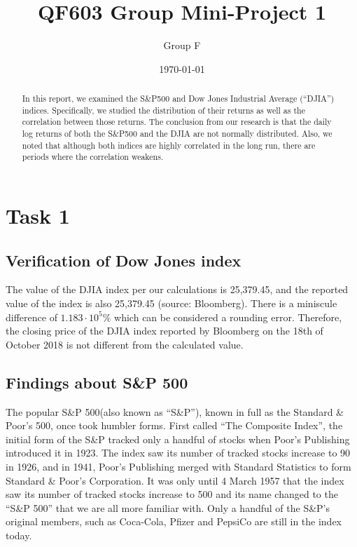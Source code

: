 \documentclass[a4paper]{article}
\title{QF603 Group Mini-Project 1}
\author{Group F}
\date{\today}
\begin{document}
	\maketitle
	
	\begin{abstract}
		In this report, we examined the S\&P500 and Dow Jones Industrial Average (``DJIA'') indices. Specifically, we studied the distribution of their returns as well as the correlation between those returns. The conclusion from our research is that the daily log returns of both the S\&P500 and the DJIA are not normally distributed. Also, we noted that although both indices are highly correlated in the long run, there are periods where the correlation weakens.
	\end{abstract} 
	
	\section{Task 1}
	\label{sec:introduction}
	
	\subsection{Verification of Dow Jones index}
	The value of the DJIA index per our calculations is 25,379.45, and the reported value of the index is also 25,379.45 (source: Bloomberg). There is a miniscule difference of $1.183\cdot10^5\%$ which can be considered a rounding error. Therefore, the closing price of the DJIA index reported by Bloomberg on the 18th of October 2018 is not different from the calculated value.
	
	
	\subsection{Findings about S\&P 500}
	The popular S\&P 500(also known as ``S\&P''), known in full as the Standard \& Poor’s 500, once took humbler forms. First called “The Composite Index”, the initial form of the S\&P tracked only a handful of stocks when Poor’s Publishing introduced it in 1923. The index saw its number of tracked stocks increase to 90 in 1926, and in 1941, Poor’s Publishing merged with Standard Statistics to form Standard \& Poor’s Corporation. It was only until 4 March 1957 that the index saw its number of tracked stocks increase to 500 and its name changed to the “S\&P 500” that we are all more familiar with. Only a handful of the S\&P’s original members, such as Coca-Cola, Pfizer and PepsiCo are still in the index today.
	
\end{document}
